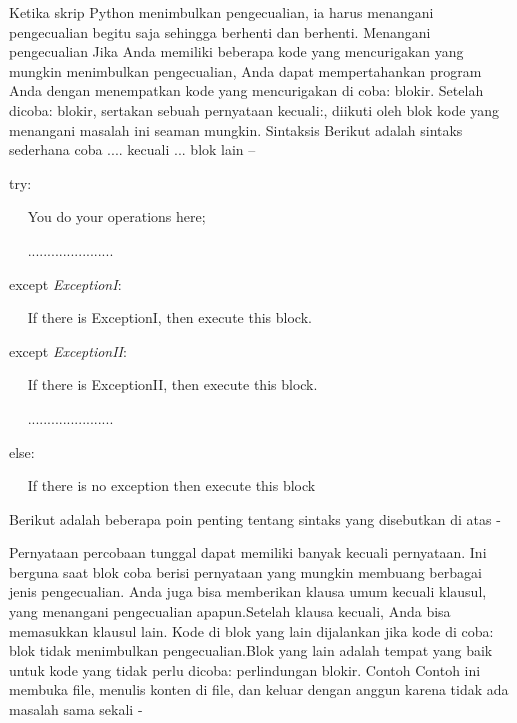 \vspace{12pt}
\noindent 
Ketika skrip Python menimbulkan pengecualian, ia harus menangani pengecualian begitu saja sehingga berhenti dan berhenti. Menangani pengecualian Jika Anda memiliki beberapa kode yang mencurigakan yang mungkin menimbulkan pengecualian, Anda dapat mempertahankan program Anda dengan menempatkan kode yang mencurigakan di coba: blokir. Setelah dicoba: blokir, sertakan sebuah pernyataan kecuali:, diikuti oleh blok kode yang menangani masalah ini seaman mungkin. Sintaksis Berikut adalah sintaks sederhana coba .... kecuali ... blok lain – \par
\vspace{12pt}
\noindent 
try: \par
\noindent 
~~ You do your operations here; \par
\noindent 
~~ ...................... \par
\noindent 
except \textit{ExceptionI}: \par
\noindent 
~~ If there is ExceptionI, then execute this block. \par
\noindent 
except \textit{ExceptionII}: \par
\noindent 
~~ If there is ExceptionII, then execute this block. \par
\noindent 
~~ ...................... \par
\noindent 
else: \par
\noindent 
~~ If there is no exception then execute this block \par
\vspace{12pt}
\vspace{12pt}
\noindent 
Berikut adalah beberapa poin penting tentang sintaks yang disebutkan di atas - \par
\noindent 
 \hspace*{0.5in} \vspace{12pt}
\vspace{12pt}
\noindent 
 \hspace*{0.5in} Pernyataan percobaan tunggal dapat memiliki banyak kecuali pernyataan. Ini berguna saat blok coba berisi pernyataan yang mungkin membuang berbagai jenis pengecualian. $  $Anda juga bisa memberikan klausa umum kecuali klausul, yang menangani pengecualian apapun.Setelah klausa kecuali, Anda bisa memasukkan klausul lain. Kode di blok yang lain dijalankan jika kode di coba: blok tidak menimbulkan pengecualian.Blok yang lain adalah tempat yang baik untuk kode yang tidak perlu dicoba: perlindungan blokir. Contoh Contoh ini membuka file, menulis konten di file, dan keluar dengan anggun karena tidak ada masalah sama sekali - \par
